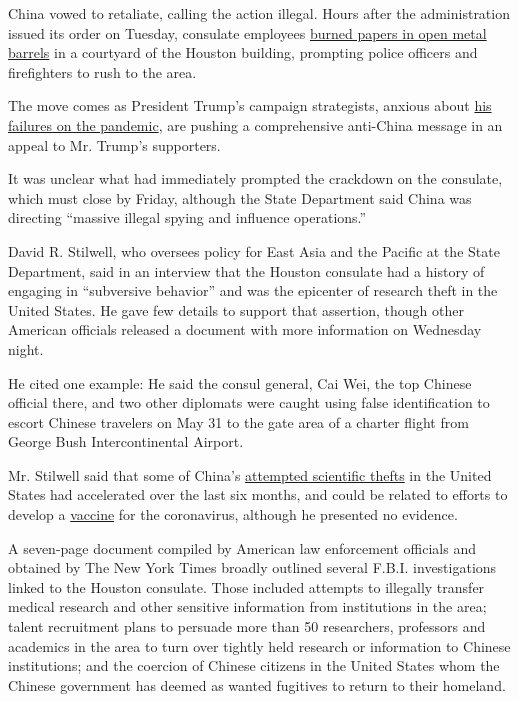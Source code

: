 China vowed to retaliate, calling the action illegal. Hours after the
administration issued its order on Tuesday, consulate employees
\href{https://www.khou.com/article/news/local/hfd-responds-reports-burning-classified-documents-chinese-consulate/285-33117055-f7c1-4626-b4b5-ae8c252401d5}{burned
papers in open metal barrels} in a courtyard of the Houston building,
prompting police officers and firefighters to rush to the area.

The move comes as President Trump's campaign strategists, anxious about
\href{https://www.nytimes3xbfgragh.onion/2020/07/18/us/politics/trump-coronavirus-response-failure-leadership.html}{his
failures on the pandemic}, are pushing a comprehensive anti-China
message in an appeal to Mr. Trump's supporters.

It was unclear what had immediately prompted the crackdown on the
consulate, which must close by Friday, although the State Department
said China was directing ``massive illegal spying and influence
operations.''

David R. Stilwell, who oversees policy for East Asia and the Pacific at
the State Department, said in an interview that the Houston consulate
had a history of engaging in ``subversive behavior'' and was the
epicenter of research theft in the United States. He gave few details to
support that assertion, though other American officials released a
document with more information on Wednesday night.

He cited one example: He said the consul general, Cai Wei, the top
Chinese official there, and two other diplomats were caught using false
identification to escort Chinese travelers on May 31 to the gate area of
a charter flight from George Bush Intercontinental Airport.

Mr. Stilwell said that some of China's
\href{https://www.nytimes3xbfgragh.onion/2019/11/04/health/china-nih-scientists.html}{attempted
scientific thefts} in the United States had accelerated over the last
six months, and could be related to efforts to develop a
\href{https://www.nytimes3xbfgragh.onion/interactive/2020/science/coronavirus-vaccine-tracker.html}{vaccine}
for the coronavirus, although he presented no evidence.

A seven-page document compiled by American law enforcement officials and
obtained by The New York Times broadly outlined several F.B.I.
investigations linked to the Houston consulate. Those included attempts
to illegally transfer medical research and other sensitive information
from institutions in the area; talent recruitment plans to persuade more
than 50 researchers, professors and academics in the area to turn over
tightly held research or information to Chinese institutions; and the
coercion of Chinese citizens in the United States whom the Chinese
government has deemed as wanted fugitives to return to their homeland.

